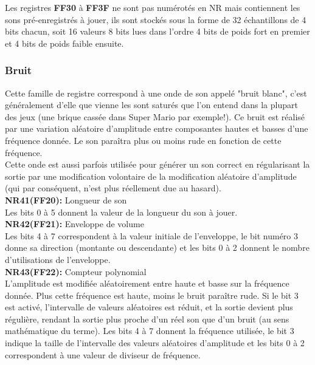 \documentclass{report}
\begin{document}
	Les registres \textbf{FF30} à \textbf{FF3F} ne sont pas numérotés en NR
		mais contiennent les sons pré-enregistrés à jouer, ils
		sont stockés sous la forme de 32 échantillons de 4
		bits chacun, soit 16 valeurs 8 bits lues dans l'ordre
		4 bits de poids fort en premier et 4 bits de poids
		faible ensuite.

	\subsubsection{Bruit}
		Cette famille de registre correspond à une onde de son
		appelé "bruit blanc", c'est généralement d'elle que
		vienne les sont saturés que l'on entend dans la
		plupart des jeux (une brique cassée dans Super Mario
		par exemple!). 
		Ce bruit est réalisé par une variation aléatoire
		d'amplitude entre composantes hautes et basses d'une
		fréquence donnée. Le son paraîtra plus ou moins rude
		en fonction de cette fréquence. \\
		Cette onde est aussi parfois utilisée pour générer un
		son correct en régularisant la sortie par une
		modification volontaire de la modification aléatoire
		d'amplitude (qui par conséquent, n'est plus réellement
		due au hasard). \\

	\textbf{NR41(FF20):} Longueur de son \\
		Les bits 0 à 5 donnent la valeur de la longueur du son
		à jouer.\\

	\textbf{NR42(FF21):} Enveloppe de volume\\
		Les bits 4 à 7 correspondent à la valeur initiale de
		l'enveloppe, le bit numéro 3 donne sa direction
		(montante ou descendante) et les bits 0 à 2 donnent le
		nombre d'utilisations de l'enveloppe.\\

	\textbf{NR43(FF22):} Compteur polynomial \\
		L'amplitude est modifiée aléatoirement entre haute et
		basse sur la fréquence donnée. Plus cette fréquence
		est haute, moins le bruit paraître rude. 
		Si le bit 3 est activé, l'intervalle de valeurs
		aléatoires est réduit, et la sortie devient plus
		régulière, rendant la sortie plus proche d'un réel
		son que d'un bruit (au sens mathématique du terme).
		Les bits 4 à 7 donnent la fréquence utilisée, le bit 3
		indique la taille de l'intervalle des valeurs
		aléatoires d'amplitude et les bits 0 à 2 correspondent
		à une valeur de diviseur de fréquence.\\ 
\end{document}
